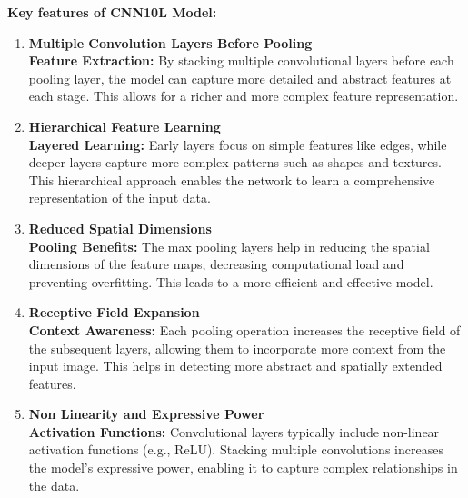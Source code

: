     \textbf{Key features of CNN10L Model:}
    \begin{enumerate}
        \item \textbf{Multiple Convolution Layers Before Pooling}\\
        \textbf{Feature Extraction:} By stacking multiple convolutional layers before each pooling layer, the model can capture more detailed and abstract features at each stage. This allows for a richer and more complex feature representation.

        \item \textbf{Hierarchical Feature Learning}\\
        \textbf{Layered Learning:} Early layers focus on simple features like edges, while deeper layers capture more complex patterns such as shapes and textures. This hierarchical approach enables the network to learn a comprehensive representation of the input data.
        
        \item \textbf{Reduced Spatial Dimensions}\\
        \textbf{Pooling Benefits:} The max pooling layers help in reducing the spatial dimensions of the feature maps, decreasing computational load and preventing overfitting. This leads to a more efficient and effective model.
        
        \item \textbf{Receptive Field Expansion}\\
        \textbf{Context Awareness:} Each pooling operation increases the receptive field of the subsequent layers, allowing them to incorporate more context from the input image. This helps in detecting more abstract and spatially extended features.
        
        \item \textbf{Non Linearity and Expressive Power}\\
        \textbf{Activation Functions:} Convolutional layers typically include non-linear activation functions (e.g., ReLU). Stacking multiple convolutions increases the model's expressive power, enabling it to capture complex relationships in the data.
        
    \end{enumerate}\par\vspace{1em}

